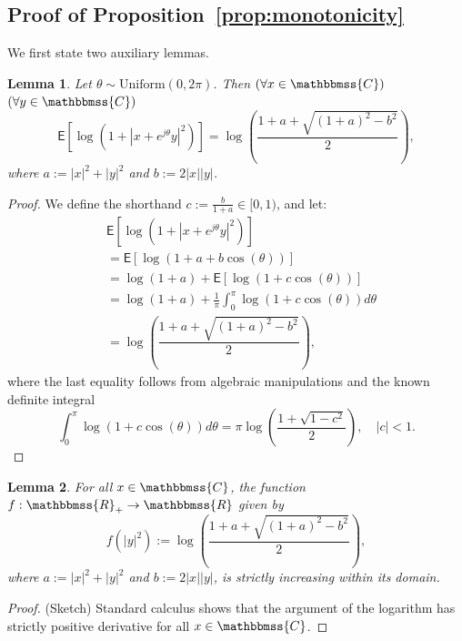 \documentclass[10pt,journal,a4paper]{IEEEtran}
\newcommand{\eqdef}{:=}
\newcommand{\E}{\mathsf{E}}		%
\newcommand{\stdset}[1]{\mathbbmss{#1}}	%
\newtheorem{lemma}{Lemma}
\begin{document}


 
\appendix
\subsection{Proof of Proposition~\ref{prop:monotonicity}}
\label{app:monotonicity}
We first state two auxiliary lemmas.
\begin{lemma}\label{lem:closedform}
Let $\theta\sim \text{Uniform}(0,2\pi)$. Then $(\forall x\in \stdset{C})$ $(\forall y  \in \stdset{C})$
\begin{equation*} 
\E[\log(1+|x+e^{j\theta}y|^2)] = \log\left(\dfrac{1+a+\sqrt{(1+a)^2-b^2}}{2}\right),
\end{equation*}
where $a := |x|^2+|y|^2$ and $b := 2|x||y|$. 
\end{lemma}
\begin{proof}
We define the shorthand $c := \frac{b}{1+a} \in [0,1)$, and let:
\begin{align*}
&\E[\log(1+|x+e^{j\theta}y|^2)] \\
&= \E[\log(1+a+b\cos(\theta))]\\
&= \log(1+a) + \E[\log(1+c\cos(\theta))]\\
&= \log(1+a) + \frac{1}{\pi}\int_0^{\pi}\log\left(1+c\cos(\theta)\right)d\theta \\
&= \log\left(\dfrac{1+a+\sqrt{(1+a)^2-b^2}}{2}\right),
\end{align*} 
where the last equality follows from algebraic manipulations and the known definite integral
\begin{equation*}
\int_0^\pi\log\left(1+c\cos(\theta)\right)d\theta = \pi\log\left(\frac{1+\sqrt{1-c^2}}{2} \right), \quad |c|<1.
\end{equation*}
\end{proof}

\begin{lemma}\label{lem:monotone}For all $x\in \stdset{C}$, the function $f: \stdset{R}_+ \to \stdset{R}$ given by
\begin{equation*} 
f(|y|^2)\eqdef \log\left(\dfrac{1+a+\sqrt{(1+a)^2-b^2}}{2}\right),
\end{equation*}
where $a := |x|^2+|y|^2$ and $b := 2|x||y|$, is strictly increasing within its domain.
\end{lemma}
\begin{proof}(Sketch)
Standard calculus shows that the argument of the logarithm has strictly positive derivative for all $x\in \stdset{C}$.
\end{proof}
\end{document}
